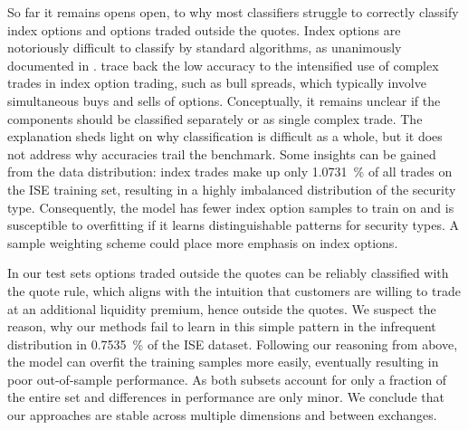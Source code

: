 So far it remains opens open, to why most classifiers struggle to correctly classify index options and options traded outside the quotes. Index options are notoriously difficult to classify by standard algorithms, as unanimously documented in \textcites[][898-898]{savickasInferringDirectionOption2003}[][20]{grauerOptionTradeClassification2022}. \textcite[][898-898]{savickasInferringDirectionOption2003} trace back the low accuracy to the intensified use of complex trades in index option trading, such as bull spreads, which typically involve simultaneous buys and sells of options. Conceptually, it remains unclear if the components should be classified separately or as single complex trade. The explanation sheds light on why classification is difficult as a whole, but it does not address why accuracies trail the benchmark. Some insights can be gained from the data distribution: index trades make up only \SI{1.0731}{\percent} of all trades on the \gls{ISE} training set, resulting in a highly imbalanced distribution of the security type. Consequently, the model has fewer index option samples to train on and is susceptible to overfitting if it learns distinguishable patterns for security types. A sample weighting scheme could place more emphasis on index options. 

In our test sets options traded outside the quotes can be reliably classified with the quote rule, which aligns with the intuition that customers are willing to trade at an additional liquidity premium, hence outside the quotes. We suspect the reason, why our methods fail to learn in this simple pattern in the infrequent distribution in \SI{0.7535}{\percent} of the \gls{ISE} dataset. Following our reasoning from above, the model can overfit the training samples more easily, eventually resulting in poor out-of-sample performance. As both subsets account for only a fraction of the entire set and differences in performance are only minor. We conclude that our approaches are stable across multiple dimensions and between exchanges.

